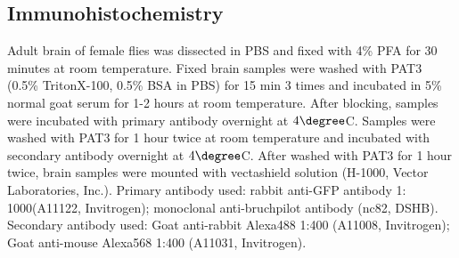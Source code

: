 \subsection*{Immunohistochemistry}

Adult brain of female flies was dissected in PBS and fixed with 4\% PFA for 30 minutes at room temperature.
Fixed brain samples were washed with PAT3 (0.5\% TritonX-100, 0.5\% BSA in PBS) for 15 min 3 times and incubated in 5\% normal goat serum for 1-2 hours at room temperature.
After blocking, samples were incubated with primary antibody overnight at $4\degree$C.
Samples were washed with PAT3 for 1 hour twice at room temperature and incubated with secondary antibody overnight at $4\degree$C.
After washed with PAT3 for 1 hour twice, brain samples were mounted with vectashield solution (H-1000, Vector Laboratories, Inc.).
Primary antibody used: rabbit anti-GFP antibody 1: 1000(A11122, Invitrogen); monoclonal anti-bruchpilot antibody (nc82, DSHB).
Secondary antibody used: Goat anti-rabbit Alexa488 1:400 (A11008, Invitrogen); Goat anti-mouse Alexa568 1:400 (A11031, Invitrogen).
    